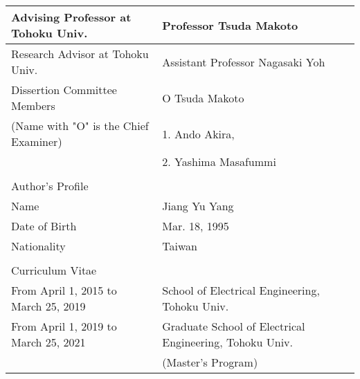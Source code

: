 \begin{titlepage}

  \begin{table}[H]
    \centering
    \begin{tabular}{|l|l|}\hline
      Advising Professor at Tohoku Univ. & Professor Tsuda Makoto\\\hline
      Research Advisor at Tohoku Univ. & Assistant Professor Nagasaki Yoh\\\hline
      Dissertion Committee Members & O Tsuda Makoto \\
      (Name with "O" is the Chief Examiner) & 1. Ando Akira, \\
      &2. Yashima Masafummi\\\hline
      &\\
      Author's Profile & \\\hline
      Name & Jiang Yu Yang\\\hline
      Date of Birth & Mar. 18, 1995\\\hline
      Nationality & Taiwan\\\hline
      &\\
      Curriculum Vitae&\\\hline
      From April 1, 2015 to March 25, 2019 & School of Electrical Engineering, Tohoku Univ.\\\hline
      From April 1, 2019 to March 25, 2021 & Graduate School of Electrical Engineering, Tohoku Univ. \\
      &(Master's Program)\\\hline
    \end{tabular}
  \end{table}




\end{titlepage}
